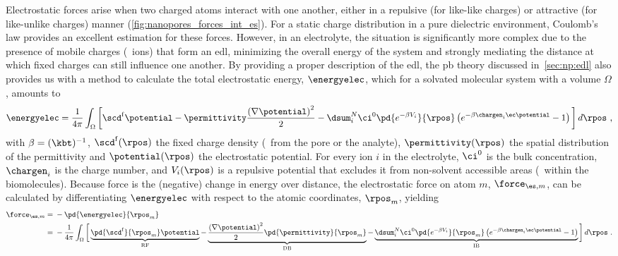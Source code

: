 Electrostatic forces arise when two charged atoms interact with one another, either in a repulsive (for
like-like charges) or attractive (for like-unlike charges) manner (\cref{fig:nanopores_forces_int_es}). For a
static charge distribution in a pure dielectric environment, Coulomb's law provides an excellent estimation
for these forces. However, in an electrolyte, the situation is significantly more complex due to the presence
of mobile charges (\ie~ions) that form an \gls{edl}, minimizing the overall energy of the system and strongly
mediating the distance at which fixed charges can still influence one another. By providing a proper
description of the \gls{edl}, the \gls{pb} theory discussed in~\cref{sec:np:edl} also provides us with a
method to calculate the total electrostatic energy, $\energyelec$, which for a solvated molecular system with
a volume $\Omega$, amounts to~\cite{Gilson-1993,Im-1998,Baker-2005}
%
\begin{align}\label{eq:nanopores_electrostatic_energy}
  \energyelec = 
  \dfrac{1}{4 \pi} \int_{\Omega}
  \bigg[
    \scd^{\rm{f}} \potential
    - \permittivity \dfrac{\left(\nabla \potential \right)^2}{2}
    - \dsum_{i}^{N} \ci^0 \pd{ e^{- \beta V_i} }{\rpos}
                    \left( e^{ - \beta \chargen_i \ec \potential } - 1 \right)
  \bigg] \, d\rpos
  \text{ ,}
\end{align}
%
with $\beta = (\kbt)^{-1}$, $\scd^{\rm{f}}(\rpos)$ the fixed charge density (\ie~from the pore or the
analyte), $\permittivity(\rpos)$ the spatial distribution of the permittivity and $\potential(\rpos)$ the
electrostatic potential. For every ion $i$ in the electrolyte, $\ci^0$ is the bulk concentration, $\chargen_i$
is the charge number, and $V_i(\rpos)$ is a repulsive potential that excludes it from non-solvent accessible
areas (\eg~within the biomolecules). Because force is the (negative) change in energy over distance, the
electrostatic force on atom $m$, $\force_{\es,m}$, can be calculated by differentiating $\energyelec$ with
respect to the atomic coordinates, $\rpos_m$, yielding~\cite{Gilson-1993,Im-1998,Baker-2005}
%
\begin{align}\label{eq:nanopores_electrostatic_force}
  \force_{\es,m} ={}& - \pd{\energyelec}{\rpos_m} \notag \\
    ={}& - \dfrac{1}{4 \pi} \int_{\Omega} \bigg[ 
      \underbrace{ \pd{\scd^{\rm{f}}}{\rpos_m} \potential }_{ \text{RF} }
      - \underbrace{ \dfrac{\left(\nabla \potential \right)^2}{2} 
      \pd{\permittivity}{\rpos_m} }_{ \text{DB} }
      - \underbrace{ \dsum_{i}^{N}
          \ci^0 \pd{ e^{- \beta V_i} }{\rpos_m}
          \left( e^{ - \beta \chargen_i \ec \potential } - 1 \right) }_{ \text{IB} }
          \bigg] \, d\rpos
  \text{ .}
\end{align}

